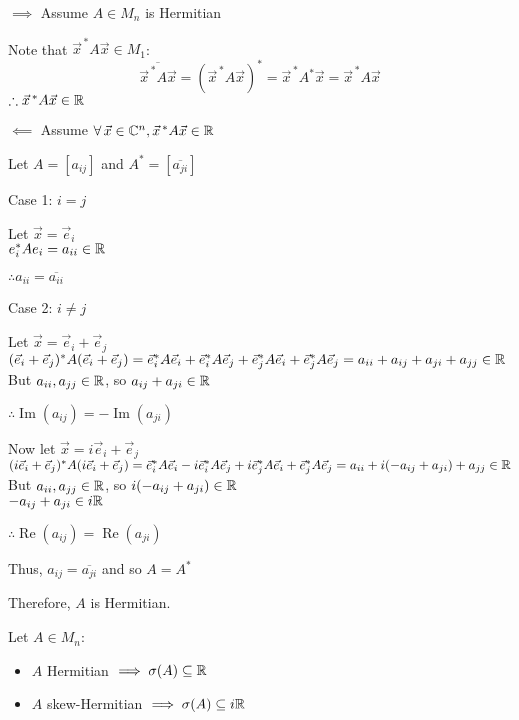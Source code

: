 \documentclass[letterpaper,12pt,fleqn]{article}
\newcommand{\vx}{\vec{x}}
\newcommand{\vxct}{\vx^{\,*}}
\newcommand{\ve}{\vec{e}}
\newcommand{\conj}[1]{\overline{#1}}
\renewcommand{\o}{\sigma}
\DeclareMathOperator{\Imag}{Im}
\DeclareMathOperator{\Real}{Re}
\begin{document}
\begin{theproof}
  \listbreak
  \begin{description}
  \item $\implies$ Assume $A\in M_n$ is Hermitian

    Note that $\vxct A\vx\in M_1$:
    \[\conj{\vxct A\vx}=(\vxct A\vx)^*=\vxct A^*\vx=\vxct A\vx\]
    $\therefore\vxct A\vx\in\R$

  \item $\impliedby$ Assume $\forall\,\vx\in\C^n,\vxct A\vx\in\R$

    Let $A=[a_{ij}]$ and $A^*=[\conj{a_{ji}}]$
    \begin{description}
    \item Case 1: $i=j$

      Let $\vx=\ve_i$ \\
      $e_i^*Ae_i=a_{ii}\in\mathbb{R}$

      $\therefore a_{ii}=\conj{a_{ii}}$

    \item Case 2: $i\ne j$

      Let $\vx=\ve_i+\ve_j$ \\
      $(\ve_i+\ve_j)^*A(\ve_i+\ve_j)=
      \ve_i^*A\ve_i+\ve_i^*A\ve_j+\ve_j^*A\ve_i+\ve_j^*A\ve_j=
      a_{ii}+a_{ij}+a_{ji}+a_{jj}\in\R$ \\
      But $a_{ii},a_{jj}\in\mathbb{R}$, so $a_{ij}+a_{ji}\in\mathbb{R}$

      $\therefore\Imag(a_{ij})=-\Imag(a_{ji})$

      Now let $\vx=i\ve_i+\ve_j$
      $(i\ve_i+\ve_j)^*A(i\ve_i+\ve_j)=
      \ve_i^*A\ve_i-i\ve_i^*A\ve_j+i\ve_j^*A\ve_i+\ve_j^*A\ve_j=
      a_{ii}+i(-a_{ij}+a_{ji})+a_{jj}\in\R$ \\
      But $a_{ii},a_{jj}\in\mathbb{R}$, so $i(-a_{ij}+a_{ji})\in\mathbb{R}$ \\
      $-a_{ij}+a_{ji}\in i\mathbb{R}$

      $\therefore\Real(a_{ij})=\Real(a_{ji})$
    \end{description}
    Thus, $a_{ij}=\conj{a_{ji}}$ and so $A=A^*$

    Therefore, $A$ is Hermitian.
  \end{description}
\end{theproof}

\begin{theorem}
  Let $A\in M_n$:
  \begin{itemize}
  \item $A$ Hermitian $\implies \o(A)\subseteq\R$
  \item $A$ skew-Hermitian $\implies \o(A)\subseteq i\R$
  \end{itemize}
\end{theorem}
\end{document}
